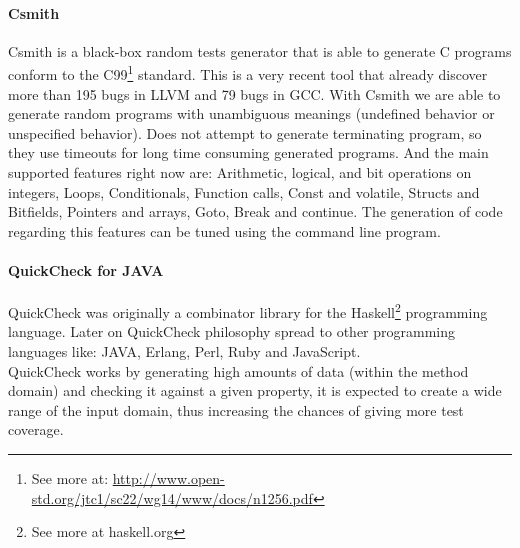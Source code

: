 \paragraph{Csmith}
Csmith\cite{Yang:2011:FUB:1993316.1993532} is a black-box random tests generator that is able to generate C programs
conform to the C99\footnote{See more at: \url{http://www.open-std.org/jtc1/sc22/wg14/www/docs/n1256.pdf}} standard. This is a very recent tool that already discover
more than 195 bugs in \ac{LLVM} and 79 bugs in \ac{GCC}. With Csmith we are able to generate random programs with unambiguous meanings (undefined behavior or 
unspecified behavior). Does not attempt to generate terminating program, so they use timeouts for long time consuming generated programs.
And the main supported features right now are: Arithmetic, logical, and bit operations on integers, Loops, Conditionals, Function calls, Const and volatile,
Structs and Bitfields, Pointers and arrays, Goto, Break and continue. The generation of code regarding this features can be tuned using the command line program.

\paragraph{QuickCheck for JAVA}
QuickCheck was originally a combinator library for the Haskell\footnote{See more at haskell.org} programming language\cite{Claessen:2000:QLT:357766.351266}.
Later on QuickCheck philosophy spread to other programming languages like: JAVA, Erlang, Perl, Ruby and JavaScript.\\
QuickCheck works by generating high amounts of data (within the method domain) and checking it against a given property,
it is expected to create a wide range of the input domain, thus increasing the chances of giving more test coverage.
\secendnote
